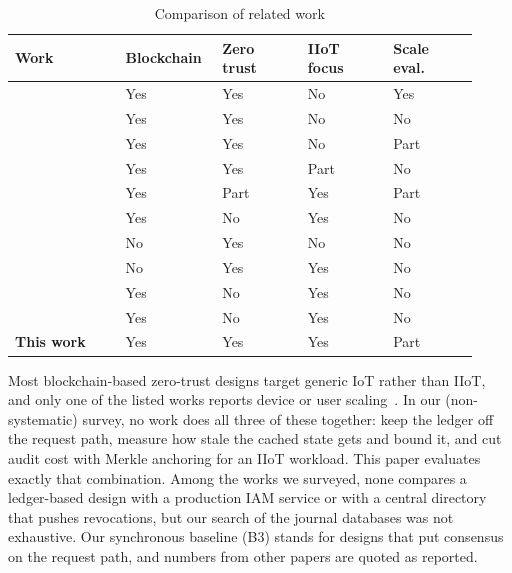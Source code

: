 \documentclass[a4paper,5p,times,twocolumn,number,sort&compress]{elsarticle}
\begin{document}
\begin{table}[!t]
\caption{Comparison of related work}
\label{tab:related}
\footnotesize
\renewcommand{\arraystretch}{0.92}\setlength{\tabcolsep}{2pt}
\begin{tabular}{>{\raggedright\arraybackslash}p{0.228\linewidth}>{\centering\arraybackslash}p{0.174\linewidth}>{\centering\arraybackslash}p{0.174\linewidth}>{\centering\arraybackslash}p{0.174\linewidth}>{\centering\arraybackslash}p{0.174\linewidth}}
\toprule
\textbf{Work} & \textbf{Blockchain} & \textbf{Zero trust} & \textbf{IIoT focus} & \textbf{Scale eval.} \\
\midrule
~\cite{salim} & Yes & Yes & No & Yes \\
~\cite{aleisa} & Yes & Yes & No & No \\
~\cite{nie} & Yes & Yes & No & Part \\
~\cite{sharma} & Yes & Yes & Part & No \\
~\cite{ali} & Yes & Part & Yes & Part \\
~\cite{li_hyper} & Yes & No & Yes & No \\
~\cite{ma} & No & Yes & No & No \\
~\cite{zanasi} & No & Yes & Yes & No \\
~\cite{ding25} & Yes & No & Yes & No \\
~\cite{xu25} & Yes & No & Yes & No \\
\textbf{This work} & Yes & Yes & Yes & Part \\
\bottomrule
\end{tabular}
\par\vspace{2pt}{\scriptsize Yes = addressed; Part = partly; No = not addressed (authors' reading). ``Scale eval.'' = device or user scaling reported; for this work partial (200 devices end to end, one million in a proof microbenchmark). Ratings of the newest works rest on abstracts and summaries, so ``No'' there may mean ``not stated''.}
\end{table}

Most blockchain-based zero-trust designs target generic IoT rather than IIoT, and only one of the listed works reports device or user scaling~\cite{salim}. In our (non-systematic) survey, no work does all three of these together: keep the ledger off the request path, measure how stale the cached state gets and bound it, and cut audit cost with Merkle anchoring for an IIoT workload. This paper evaluates exactly that combination. Among the works we surveyed, none compares a ledger-based design with a production IAM service or with a central directory that pushes revocations, but our search of the journal databases was not exhaustive. Our synchronous baseline (B3) stands for designs that put consensus on the request path, and numbers from other papers are quoted as reported.
\end{document}
